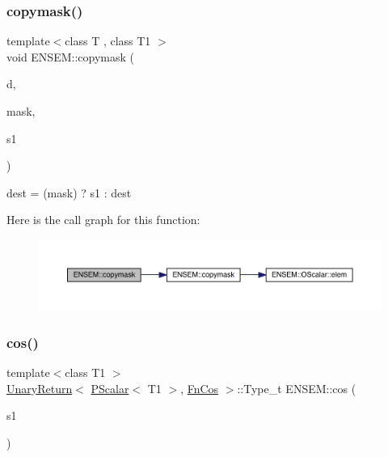 \subsubsection{\texorpdfstring{copymask()}{copymask()}}
{\footnotesize\ttfamily template$<$class T , class T1 $>$ \\
void E\+N\+S\+E\+M\+::copymask (\begin{DoxyParamCaption}\item[{\mbox{\hyperlink{classENSEM_1_1PScalar}{P\+Scalar}}$<$ T $>$ \&}]{d,  }\item[{const \mbox{\hyperlink{classENSEM_1_1PScalar}{P\+Scalar}}$<$ T1 $>$ \&}]{mask,  }\item[{const \mbox{\hyperlink{classENSEM_1_1PScalar}{P\+Scalar}}$<$ T $>$ \&}]{s1 }\end{DoxyParamCaption})\hspace{0.3cm}{\ttfamily [inline]}}



dest = (mask) ? s1 \+: dest 

Here is the call graph for this function\+:\nopagebreak
\begin{figure}[H]
\begin{center}
\leavevmode
\includegraphics[width=350pt]{db/dcc/group__primscalar_gae14d6fea866a875601cb8d100fc8b3c2_cgraph}
\end{center}
\end{figure}
\mbox{\label{group__primscalar_ga0d6f04344bee0fa65f96047c4c9e2fa3}} 
\subsubsection{\texorpdfstring{cos()}{cos()}}
{\footnotesize\ttfamily template$<$class T1 $>$ \\
\mbox{\hyperlink{structENSEM_1_1UnaryReturn}{Unary\+Return}}$<$ \mbox{\hyperlink{classENSEM_1_1PScalar}{P\+Scalar}}$<$ T1 $>$, \mbox{\hyperlink{structENSEM_1_1FnCos}{Fn\+Cos}} $>$\+::Type\+\_\+t E\+N\+S\+E\+M\+::cos (\begin{DoxyParamCaption}\item[{const \mbox{\hyperlink{classENSEM_1_1PScalar}{P\+Scalar}}$<$ T1 $>$ \&}]{s1 }\end{DoxyParamCaption})\hspace{0.3cm}{\ttfamily [inline]}}

